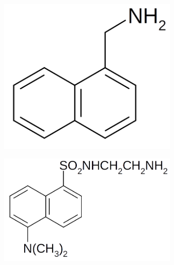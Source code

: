 \documentclass[journal=mamobx,manuscript=article]{achemso}
\begin{document}
\begin{figure}[H]
\begin{subfigure}[b]{0.3\textwidth}
        \includegraphics[scale=0.5]{fig1C.png}
        \caption{}
        \label{fig:C}
    \end{subfigure}
    \begin{subfigure}[b]{0.3\textwidth}
        \includegraphics[scale=0.5]{fig1D.png}
        \caption{}
        \label{fig:D}
    \end{subfigure}
    \begin{subfigure}[b]{0.3\textwidth}

\end{subfigure}
\end{figure}
\end{document}
